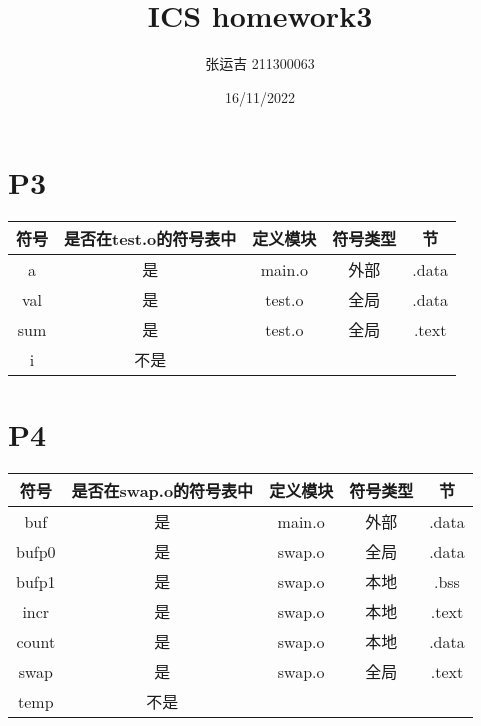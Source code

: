 \documentclass{article}
\title{ICS homework3}
\author{张运吉 211300063}
\date{16/11/2022}
\begin{document}
 
\maketitle %

\section*{P3}

\begin{table}[h]
	\begin{center} %
	  \begin{tabular}{c|c|c|c|c} %
		\hline
		\textbf{符号} & \textbf{是否在test.o的符号表中} & \textbf{定义模块} & \textbf{符号类型} & \textbf{节}\\
		\hline
		a & 是 & main.o & 外部 & .data \\
		\hline
		val & 是 & test.o & 全局 & .data \\
		\hline
		sum & 是 & test.o & 全局 & .text \\
		\hline
		i & 不是 & &  &  \\
		\hline
		
	  \end{tabular}
	\end{center}
\end{table}

\section*{P4}

\begin{table}[h]
	\begin{center} %
	  \begin{tabular}{c|c|c|c|c} %
		\hline
		\textbf{符号} & \textbf{是否在swap.o的符号表中} & \textbf{定义模块} & \textbf{符号类型} & \textbf{节}\\
		\hline
		buf & 是 & main.o & 外部 & .data \\
		\hline
		bufp0 & 是 & swap.o & 全局 & .data \\
		\hline
		bufp1 & 是 & swap.o & 本地 & .bss \\
		\hline
		incr & 是 & swap.o & 本地 & .text \\
		\hline
		count & 是 & swap.o & 本地 & .data \\
		\hline
		swap & 是 & swap.o & 全局 & .text \\
		\hline
		temp & 不是 & &  &  \\
	  \end{tabular}
	\end{center}
\end{table}
\end{document}
